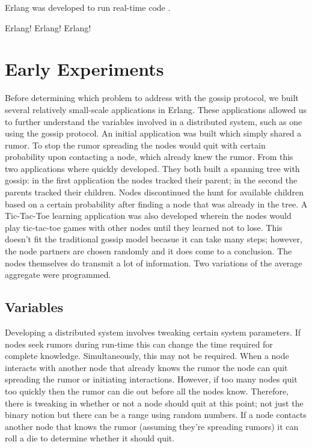 \documentclass[11pt,twocolumn]{article}
\begin{document}
Erlang was developed to run real-time code \cite{Erlang}.

Erlang!  Erlang!  Erlang!

\section{Early Experiments}

Before determining which problem to address with the gossip protocol, we built several relatively small-scale applications in Erlang.  These applications allowed us to further understand the variables involved in a distributed system, such as one using the gossip protocol.  An initial application was built which simply shared a rumor.  To stop the rumor spreading the nodes would quit with certain probability upon contacting a node, which already knew the rumor.  From this two applications where quickly developed.  They both built a spanning tree with gossip: in the first application the nodes tracked their parent; in the second the parents tracked their children.  Nodes discontinued the hunt for available children based on a certain probability after finding a node that was already in the tree.  A Tic-Tac-Toe learning application was also developed wherein the nodes would play tic-tac-toe games with other nodes until they learned not to lose.  This doesn't fit the traditional gossip model becasue it can take many steps; however, the node partners are chosen randomly and it does come to a conclusion.  The nodes themselves do transmit a lot of information.  Two variations of the average aggregate were programmed.

\subsection{Variables}

Developing a distributed system involves tweaking certain system parameters.  If nodes seek rumors during run-time this can change the time required for complete knowledge.  Simultaneously, this may not be required.  When a node interacts with another node that already knows the rumor the node can quit spreading the rumor or initiating interactions.  However, if too many nodes quit too quickly then the rumor can die out before all the nodes know.  Therefore, there is tweaking in whether or not a node should quit at this point; not just the binary notion but there can be a range using random numbers.  If a node contacts another node that knows the rumor (assuming they're spreading rumors) it can roll a die to determine whether it should quit.  
\end{document}
